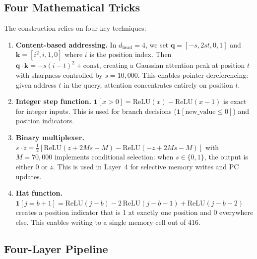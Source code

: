 \documentclass[11pt,a4paper]{article}
\begin{document}
\subsection{Four Mathematical Tricks}

The construction relies on four key techniques:

\begin{enumerate}[nosep]
  \item \textbf{Content-based addressing.} In $d_\text{head} = 4$, we set $\mathbf{q} = [-s, 2st, 0, 1]$ and $\mathbf{k} = [i^2, i, 1, 0]$ where $i$ is the position index.
  Then $\mathbf{q} \cdot \mathbf{k} = -s(i - t)^2 + \text{const}$, creating a Gaussian attention peak at position $t$ with sharpness controlled by $s = 10{,}000$.
  This enables pointer dereferencing: given address $t$ in the query, attention concentrates entirely on position $t$.

  \item \textbf{Integer step function.} $\mathbf{1}[x > 0] = \text{ReLU}(x) - \text{ReLU}(x - 1)$ is exact for integer inputs.
  This is used for branch decisions ($\mathbf{1}[\text{new\_value} \leq 0]$) and position indicators.

  \item \textbf{Binary multiplexer.} $s \cdot z = \frac{1}{2}[\text{ReLU}(z + 2Ms - M) - \text{ReLU}(-z + 2Ms - M)]$ with $M = 70{,}000$ implements conditional selection: when $s \in \{0, 1\}$, the output is either 0 or $z$.
  This is used in Layer~4 for selective memory writes and PC updates.

  \item \textbf{Hat function.} $\mathbf{1}[j = b{+}1] = \text{ReLU}(j{-}b) - 2\,\text{ReLU}(j{-}b{-}1) + \text{ReLU}(j{-}b{-}2)$ creates a position indicator that is 1 at exactly one position and 0 everywhere else.
  This enables writing to a single memory cell out of 416.
\end{enumerate}

\subsection{Four-Layer Pipeline}
\end{document}
